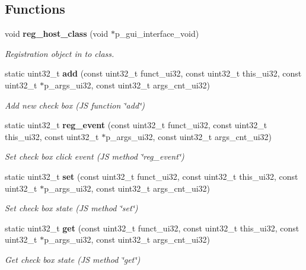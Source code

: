\subsection*{Functions}
\begin{DoxyCompactItemize}
\item 
void \textbf{ reg\+\_\+host\+\_\+class} (void $\ast$p\+\_\+gui\+\_\+interface\+\_\+void)
\begin{DoxyCompactList}\small\item\em Registration object in to class. \end{DoxyCompactList}\item 
static uint32\+\_\+t \textbf{ add} (const uint32\+\_\+t funct\+\_\+ui32, const uint32\+\_\+t this\+\_\+ui32, const uint32\+\_\+t $\ast$p\+\_\+args\+\_\+ui32, const uint32\+\_\+t args\+\_\+cnt\+\_\+ui32)
\begin{DoxyCompactList}\small\item\em Add new check box (JS function \char`\"{}add\char`\"{}) \end{DoxyCompactList}\item 
static uint32\+\_\+t \textbf{ reg\+\_\+event} (const uint32\+\_\+t funct\+\_\+ui32, const uint32\+\_\+t this\+\_\+ui32, const uint32\+\_\+t $\ast$p\+\_\+args\+\_\+ui32, const uint32\+\_\+t args\+\_\+cnt\+\_\+ui32)
\begin{DoxyCompactList}\small\item\em Set check box click event (JS method \char`\"{}reg\+\_\+event\char`\"{}) \end{DoxyCompactList}\item 
static uint32\+\_\+t \textbf{ set} (const uint32\+\_\+t funct\+\_\+ui32, const uint32\+\_\+t this\+\_\+ui32, const uint32\+\_\+t $\ast$p\+\_\+args\+\_\+ui32, const uint32\+\_\+t args\+\_\+cnt\+\_\+ui32)
\begin{DoxyCompactList}\small\item\em Set check box state (JS method \char`\"{}set\char`\"{}) \end{DoxyCompactList}\item 
static uint32\+\_\+t \textbf{ get} (const uint32\+\_\+t funct\+\_\+ui32, const uint32\+\_\+t this\+\_\+ui32, const uint32\+\_\+t $\ast$p\+\_\+args\+\_\+ui32, const uint32\+\_\+t args\+\_\+cnt\+\_\+ui32)
\begin{DoxyCompactList}\small\item\em Get check box state (JS method \char`\"{}get\char`\"{}) \end{DoxyCompactList}\item 

\end{DoxyCompactItemize}
